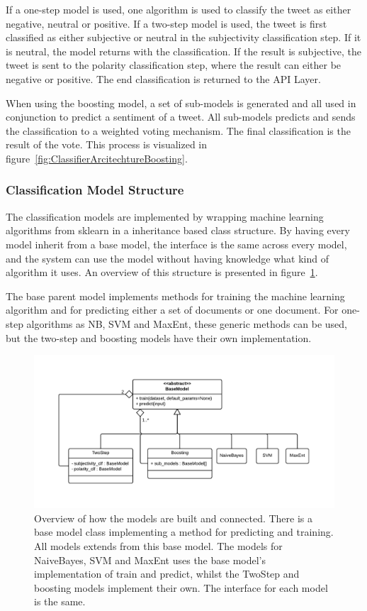 If a one-step model is used, one algorithm is used to classify the tweet as either negative, neutral or positive. If a two-step model is used, the tweet is first classified as either subjective or neutral in the subjectivity classification step. If it is neutral, the model returns with the classification. If the result is subjective, the tweet is sent to the polarity classification step, where the result can either be negative or positive. The end classification is returned to the API Layer.

When using the boosting model, a set of sub-models is generated and all used in conjunction to predict a sentiment of a tweet. All sub-models predicts and sends the classification to a weighted voting mechanism. The final classification is the result of the vote. This process is visualized in figure~\ref{fig:ClassifierArcitechtureBoosting}.

\subsubsection{Classification Model Structure}

The classification models are implemented by wrapping machine learning algorithms from sklearn in a inheritance based class structure. By having every model inherit from a base model, the interface is the same across every model, and the system can use the model without having knowledge what kind of algorithm it uses. An overview of this structure is presented in figure~\ref{fig:ModelsStructure}.

The base parent model implements methods for training the machine learning algorithm and for predicting either a set of documents or one document. For one-step algorithms as NB, SVM and MaxEnt, these generic methods can be used, but the two-step and boosting models have their own implementation. 
 
\begin{figure}[!ht]
 \begin{center}
     \includegraphics[width=\textwidth]{../img/ModelsStructure.pdf}
 \end{center}
 \caption[Classification Model Structure Overview]{Overview of how the models are built and connected. There is a base model class implementing a method for predicting and training. All models extends from this base model. The models for NaiveBayes, SVM and MaxEnt uses the base model's implementation of train and predict, whilst the TwoStep and boosting models implement their own. The interface for each model is the same.}
 \label{fig:ModelsStructure}
\end{figure}


